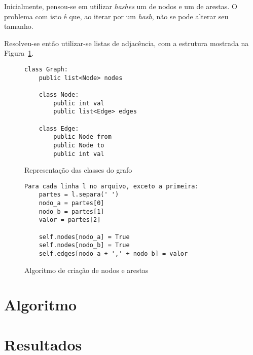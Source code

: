 \documentclass[12pt]{article}
\begin{document}
Inicialmente, pensou-se em utilizar \textit{hashes} um de nodos e um de arestas.
O problema com isto é que, ao iterar por um \textit{hash}, não se pode alterar
seu tamanho.

Resolveu-se então utilizar-se listas de adjacência, com a estrutura mostrada na
Figura~\ref{fig:estrutura:classes}.

\begin{figure}[htb!]
    \begin{lstlisting}
class Graph:
    public list<Node> nodes

    class Node:
        public int val
        public list<Edge> edges

    class Edge:
        public Node from
        public Node to
        public int val
    \end{lstlisting}
  \caption{Representação das classes do grafo}
\label{fig:estrutura:classes}
\end{figure}

\begin{figure}[htb!]
  \centering
\begin{lstlisting}
Para cada linha l no arquivo, exceto a primeira:
    partes = l.separa(' ')
    nodo_a = partes[0]
    nodo_b = partes[1]
    valor = partes[2]

    self.nodes[nodo_a] = True
    self.nodes[nodo_b] = True
    self.edges[nodo_a + ',' + nodo_b] = valor
\end{lstlisting}
  \caption{Algoritmo de criação de nodos e arestas}
  \label{fig:estrutura:alg:leitura}
\end{figure}

\section{Algoritmo}\label{sec:algoritmo}

\section{Resultados}\label{sec:resultados}
\end{document}
